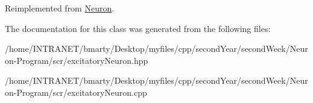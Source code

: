 Reimplemented from \hyperlink{classNeuron_aec2283fbfaba764cd088e6d16b0a74bb}{Neuron}.



The documentation for this class was generated from the following files\-:\begin{DoxyCompactItemize}
\item 
/home/\-I\-N\-T\-R\-A\-N\-E\-T/bmarty/\-Desktop/myfiles/cpp/second\-Year/second\-Week/\-Neuron-\/\-Program/scr/excitatory\-Neuron.\-hpp\item 
/home/\-I\-N\-T\-R\-A\-N\-E\-T/bmarty/\-Desktop/myfiles/cpp/second\-Year/second\-Week/\-Neuron-\/\-Program/scr/excitatory\-Neuron.\-cpp\end{DoxyCompactItemize}
